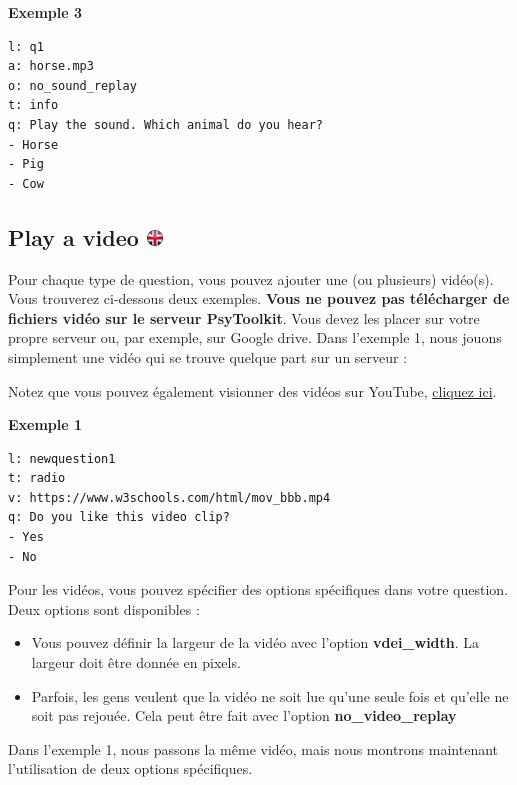 \documentclass[
]{book}
\providecommand{\tightlist}{%
  \setlength{\itemsep}{0pt}\setlength{\parskip}{0pt}}
\begin{document}
\textbf{Exemple 3}

\begin{verbatim}
l: q1
a: horse.mp3
o: no_sound_replay
t: info
q: Play the sound. Which animal do you hear?
- Horse
- Pig
- Cow
\end{verbatim}

\hypertarget{play-a-video}{%
\subsection[Play a video ]{\texorpdfstring{Play a video \href{https://www.psytoolkit.org/doc3.4.0/online-survey-syntax.html\#video}{\protect\includegraphics{img/ukflag.png}}}{Play a video }}\label{play-a-video}}

Pour chaque type de question, vous pouvez ajouter une (ou plusieurs) vidéo(s). Vous trouverez ci-dessous deux exemples. \textbf{Vous ne pouvez pas télécharger de fichiers vidéo sur le serveur PsyToolkit}. Vous devez les placer sur votre propre serveur ou, par exemple, sur Google drive.
Dans l'exemple 1, nous jouons simplement une vidéo qui se trouve quelque part sur un serveur :

Notez que vous pouvez également visionner des vidéos sur YouTube, \protect\hyperlink{youtube}{cliquez ici}.

\textbf{Exemple 1}

\begin{verbatim}
l: newquestion1
t: radio
v: https://www.w3schools.com/html/mov_bbb.mp4
q: Do you like this video clip?
- Yes
- No
\end{verbatim}

Pour les vidéos, vous pouvez spécifier des options spécifiques dans votre question. Deux options sont disponibles :

\begin{itemize}
\tightlist
\item
  Vous pouvez définir la largeur de la vidéo avec l'option \textbf{vdei\_width}. La largeur doit être donnée en pixels.
\item
  Parfois, les gens veulent que la vidéo ne soit lue qu'une seule fois et qu'elle ne soit pas rejouée. Cela peut être fait avec l'option \textbf{no\_video\_replay}
\end{itemize}

Dans l'exemple 1, nous passons la même vidéo, mais nous montrons maintenant l'utilisation de deux options spécifiques.
\end{document}
